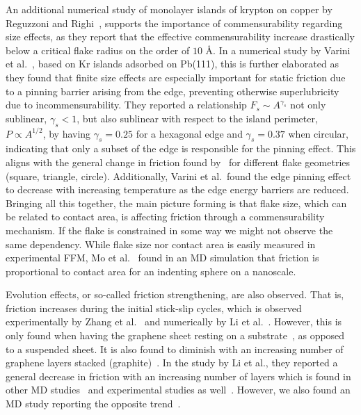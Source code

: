 An additional numerical study of monolayer islands of krypton on copper by
Reguzzoni and Righi~\cite{PhysRevB.85.201412}, supports the importance of
commensurability regarding size effects, as they report that the effective
commensurability increase drastically below a critical flake radius on the order
of $10$ Å. In a numerical study by Varini et al.~\cite{Varini_2015}, based on
Kr islands adsorbed on Pb(111), this is further elaborated as they found that
finite size effects are especially important for static friction due to a
pinning barrier arising from the edge, preventing otherwise superlubricity due
to incommensurability. They reported a relationship $F_s \sim A^{\gamma_s}$ not
only sublinear, $\gamma_s < 1$, but also sublinear with respect to the island
perimeter, $P \propto A^{1/2}$, by having $\gamma_s = 0.25$ for a hexagonal edge
and $\gamma_s = 0.37$ when circular, indicating that only a subset of the edge
is responsible for the pinning effect. This aligns with the general change in
friction found by~\cite{zhu_study_2018} for different flake geometries (square,
triangle, circle). Additionally, Varini et al.\ found the edge pinning effect to
decrease with increasing temperature as the edge energy barriers are reduced.
Bringing all this together, the main picture forming is that flake size, which
can be related to contact area, is affecting friction through a commensurability
mechanism. If the flake is constrained in some way we might not observe the same
dependency. While flake size nor contact area is easily measured in experimental
\acrshort{FFM}, Mo et al.~\cite{mo_friction_2009} found in an \acrshort{MD} simulation that friction is proportional to contact area for an indenting sphere on a nanoscale.



Evolution effects, or so-called friction strengthening, are also observed. That
is, friction increases during the initial stick-slip cycles, which is observed
experimentally by Zhang et al.~\cite{zhang_tuning_2019} and numerically by Li
et al.~\cite{li_evolving_2016}. However, this is only found when having the
graphene sheet resting on a substrate~\cite{zhang_tuning_2019}, as opposed to a
suspended sheet. It is also found to diminish with an increasing number of
graphene layers stacked (graphite)~\cite{li_evolving_2016}. In the study by Li
et al., they reported a general decrease in friction with an increasing number of layers which is found in other \acrshort{MD} studies~\cite{Yoon2015MolecularDS} and experimental studies as well~\cite{Filleter_2009, Lee_2010}. However, we also found an \acrshort{MD} study reporting the opposite trend~\cite{Reguzzoni_2012}.


